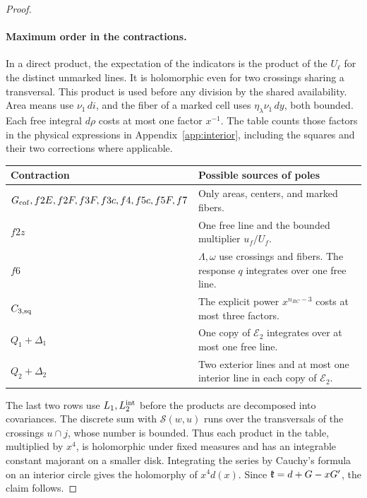 \begin{proof}
\paragraph{Maximum order in the contractions.}
In a direct product, the expectation of the indicators is the product of the \(U_\ell\) for the distinct
unmarked lines. It is holomorphic even for two crossings sharing a transversal. This product is used
before any division by the shared availability. Area means use \(\nu_1\,di\), and the fiber of a marked
cell uses \(\eta_\lambda\nu_1\,dy\), both bounded. Each free integral \(d\rho\) costs at most one factor
\(x^{-1}\). The table counts those factors in the physical expressions in Appendix~\ref{app:interior},
including the squares and their two corrections where applicable.
\begin{center}\small
\begin{tabular}{@{}lp{.54\linewidth}@{}}\toprule
Contraction & Possible sources of poles\\ \midrule
\(G_{\rm cof}, f2E, f2F,f3F,f3c,f4,f5c,f5F,f7\) & Only areas, centers, and marked fibers.\\
\(f2z\) & One free line and the bounded multiplier \(u_f/U_f\).\\
\(f6\) & \(\Lambda,\omega\) use crossings and fibers. The response \(q\) integrates over one free line.\\
\(C_{3,\rm sq}\) & The explicit power \(x^{n_{RC}-3}\) costs at most three factors.\\
\(Q_1+\Delta_1\) & One copy of \(\mathcal E_2\) integrates over at most one free line.\\
\(Q_2+\Delta_2\) & Two exterior lines and at most one interior line in each copy of \(\mathcal E_2\).\\
\bottomrule
\end{tabular}
\end{center}
The last two rows use \(L_1,L_2^{\rm int}\) before the products are decomposed into covariances. The
discrete sum with \(\mathcal S(w,u)\) runs over the transversals of the crossings \(u\cap j\), whose
number is bounded. Thus each product in the table, multiplied by \(x^4\), is holomorphic under fixed
measures and has an integrable constant majorant on a smaller disk. Integrating the series by Cauchy's
formula on an interior circle gives the holomorphy of \(x^4d(x)\). Since \(\mathfrak{k}=d+G-xG'\), the claim
follows.
\end{proof}
